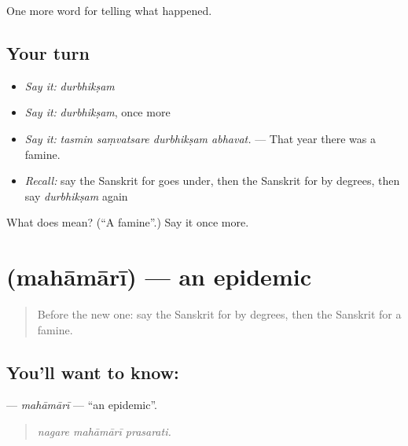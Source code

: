 \begin{grammarlens}[title={What you've built}]
One more word for telling what happened.
\end{grammarlens}

\subsection*{Your turn}
\begin{itemize}
\raggedright
  \item \emph{Say it:} \emph{durbhikṣam}
  \item \emph{Say it:} \emph{durbhikṣam}, once more
  \item \emph{Say it:} \emph{tasmin saṃvatsare durbhikṣam abhavat.} — That year there was a famine.
  \item \emph{Recall:} say the Sanskrit for goes under, then the Sanskrit for by degrees, then say \emph{durbhikṣam} again
\end{itemize}

\begin{tcolorbox}[breakable,colback=teal!4,colframe=teal!35!black,title={Before you move on}]
What does  mean? (\textquotedblleft{}A famine\textquotedblright{}.) Say it once more.
\end{tcolorbox}
\section[\texorpdfstring{\sk{महामारी} (mahāmārī)}{महामारी (mahāmārī)}]{ (mahāmārī) — an epidemic}

\label{lesson:SA-C303-mahamari}



\begin{quote}
Before the new one: say the Sanskrit for by degrees, then the Sanskrit for a famine.
\end{quote}

\subsection*{You'll want to know: }
\textbf{} — \emph{mahāmārī} — \textquotedblleft{}an epidemic\textquotedblright{}.

\begin{quote}
  
\end{quote}

\begin{quote}
\emph{nagare mahāmārī prasarati.}
\end{quote}

